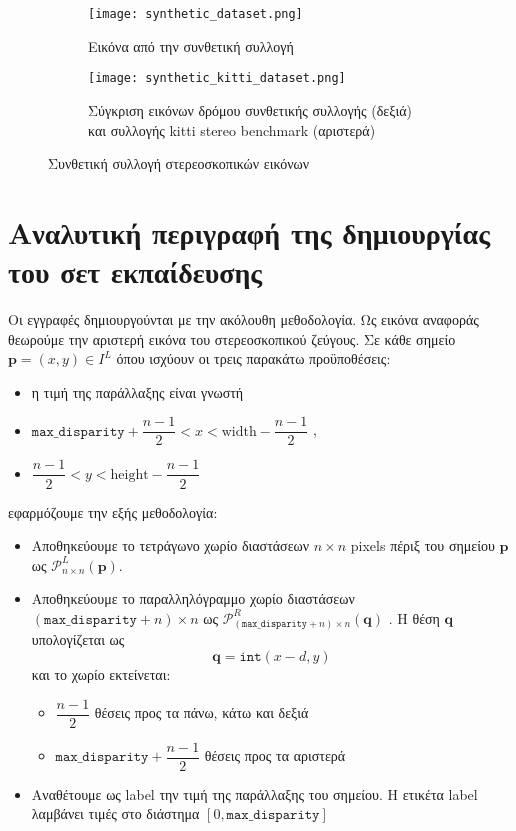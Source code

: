 \begin{figure}
	\centering
	\begin{subfigure}{0.6\textwidth}
		\texttt{[image: synthetic\_dataset.png]}
		\caption{Εικόνα από την συνθετική συλλογή}
	\end{subfigure}
	\begin{subfigure}{\textwidth}
		\texttt{[image: synthetic\_kitti\_dataset.png]}
		\caption{Σύγκριση εικόνων δρόμου συνθετικής συλλογής (δεξιά) και συλλογής \e kitti stereo benchmark \g (αριστερά)}
	\end{subfigure}
	\caption{Συνθετική συλλογή στερεοσκοπικών εικόνων}
	\label{fig:synthetic_dataset}
\end{figure}


\section{Αναλυτική περιγραφή της δημιουργίας του σετ εκπαίδευσης}
\label{appendix:dataset_creation}

Οι εγγραφές δημιουργούνται με την ακόλουθη μεθοδολογία. Ως εικόνα αναφοράς θεωρούμε την αριστερή εικόνα του στερεοσκοπικού ζεύγους. Σε κάθε σημείο \e $\textbf{p} = (x,y) \in I^L$ \g όπου ισχύουν οι τρεις παρακάτω προϋποθέσεις:
\begin{itemize}
	\item η τιμή της παράλλαξης είναι γνωστή
	\item \e $\texttt{max\_disparity} + \dfrac{n-1}{2} < x < \text{width} - \dfrac{n-1}{2}$ \g, 
	\item \e $\dfrac{n-1}{2} < y < \text{height} - \dfrac{n-1}{2}$ \g
\end{itemize}

εφαρμόζουμε την εξής μεθοδολογία:

\begin{itemize}
	\item Αποθηκεύουμε το τετράγωνο χωρίο διαστάσεων $n \times n$ \e pixels \g πέριξ του σημείου \e $\textbf{p}$ \g ως \e $\mathcal{P}_{n \times n}^L(\mathbf{p})$. \g 
	\item Αποθηκεύουμε το παραλληλόγραμμο χωρίο διαστάσεων \e $( \texttt{max\_disparity} + n) \times n$ \g ως \e $\mathcal{P}_{( \texttt{max\_disparity} + n) \times n}^R(\mathbf{q})$ \g. Η θέση \e $\mathbf{q}$ \g υπολογίζεται ως 
	\e $$\mathbf{q} = \texttt{int}(x - d, y)$$ \g και το χωρίο εκτείνεται:
	\begin{itemize}
		\item $\dfrac{n-1}{2}$ θέσεις προς τα πάνω, κάτω και δεξιά
		\item \e $\texttt{max\_disparity} + \dfrac{n-1}{2}$ \g θέσεις προς τα αριστερά
	\end{itemize}
	\item Αναθέτουμε ως \e label \g την τιμή της παράλλαξης του σημείου. Η ετικέτα \e label \g λαμβάνει τιμές στο διάστημα \e $[0,\texttt{max\_disparity}]$ \g
\end{itemize}

